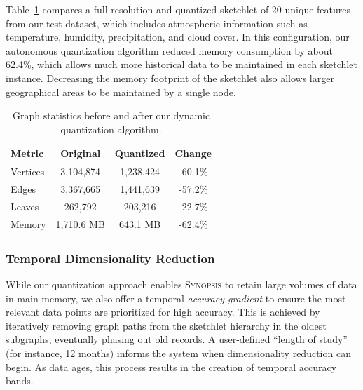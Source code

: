 Table~\ref{tbl:graph-stats} compares a full-resolution and quantized sketchlet of 20 unique features from our test dataset, which includes atmospheric information such as temperature, humidity, precipitation, and cloud cover. In this configuration, our autonomous quantization algorithm reduced memory consumption by about 62.4\%, which allows much more historical data to be maintained in each sketchlet instance. Decreasing the memory footprint of the sketchlet also allows larger geographical areas to be maintained by a single node.

\begin{table}[h!]
    \renewcommand{\arraystretch}{1.3}
    \caption{Graph statistics before and after our dynamic quantization algorithm.\vspace{-1em}}
    \label{tbl:graph-stats}
    \begin{center}
        \begin{tabular}{|l|c|c|c|}
            \hline
            \textbf{Metric} & \textbf{Original} & \textbf{Quantized} & \textbf{Change} \\
            \hline
            Vertices & 3,104,874 & 1,238,424 & -60.1\% \\
            \hline
            Edges    & 3,367,665 & 1,441,639 & -57.2\% \\
            \hline
            Leaves   & 262,792   & 203,216   & -22.7\% \\
            \hline
            Memory   & 1,710.6 MB & 643.1 MB  & -62.4\% \\
            \hline
        \end{tabular}
    \end{center}
\end{table}

\subsubsection{Temporal Dimensionality Reduction}
While our quantization approach enables \textsc{Synopsis} to retain large volumes of data in main memory, we also offer a temporal \emph{accuracy gradient} to ensure the most relevant data points are prioritized for high accuracy. This is achieved by iteratively removing graph paths from the sketchlet hierarchy in the oldest subgraphs, eventually phasing out old records. A user-defined ``length of study'' (for instance, 12 months) informs the system when dimensionality reduction can begin. As data ages, this process results in the creation of temporal accuracy bands.

